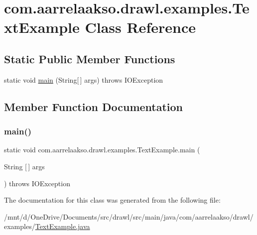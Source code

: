 \hypertarget{classcom_1_1aarrelaakso_1_1drawl_1_1examples_1_1_text_example}{}\section{com.\+aarrelaakso.\+drawl.\+examples.\+Text\+Example Class Reference}
\label{classcom_1_1aarrelaakso_1_1drawl_1_1examples_1_1_text_example}
\subsection*{Static Public Member Functions}
\begin{DoxyCompactItemize}
\item 
static void \hyperlink{classcom_1_1aarrelaakso_1_1drawl_1_1examples_1_1_text_example_a2e2d015e0b517c107a9afdedf82f92f2}{main} (String\mbox{[}$\,$\mbox{]} args)  throws I\+O\+Exception 
\end{DoxyCompactItemize}


\subsection{Member Function Documentation}
\mbox{\label{classcom_1_1aarrelaakso_1_1drawl_1_1examples_1_1_text_example_a2e2d015e0b517c107a9afdedf82f92f2}} 
\subsubsection{\texorpdfstring{main()}{main()}}
{\footnotesize\ttfamily static void com.\+aarrelaakso.\+drawl.\+examples.\+Text\+Example.\+main (\begin{DoxyParamCaption}\item[{String \mbox{[}$\,$\mbox{]}}]{args }\end{DoxyParamCaption}) throws I\+O\+Exception\hspace{0.3cm}{\ttfamily [static]}}



The documentation for this class was generated from the following file\+:\begin{DoxyCompactItemize}
\item 
/mnt/d/\+One\+Drive/\+Documents/src/drawl/src/main/java/com/aarrelaakso/drawl/examples/\hyperlink{_text_example_8java}{Text\+Example.\+java}\end{DoxyCompactItemize}
